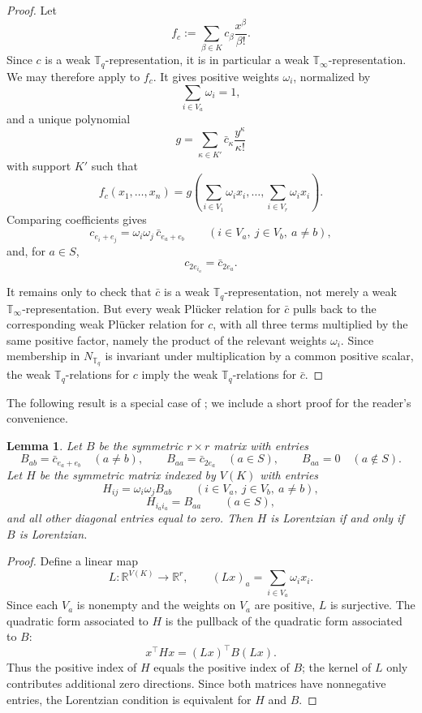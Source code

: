 \documentclass[12pt]{amsart}
\newtheorem{lemma}[theorem]{Lemma}
\theoremstyle{definition}
\newcommand{\1}{\mathbf{1}}
\newcommand\T{{\mathbb T}}
\newcommand{\mk}[2][]{\todo[color=orange, #1]{\textbf{Mario}: #2}}
\begin{document}
\begin{proof}
Let
\[
f_c:=\sum_{\beta\in K} c_\beta \frac{x^\beta}{\beta!}.
\]
Since $c$ is a weak $\T_q$-representation, it is in particular a weak
$\T_\infty$-representation.  We may therefore apply \cite[Theorem 4.7]{BHKL1} to $f_c$.  It gives positive
weights $\omega_i$, normalized by
\[
\sum_{i\in V_a}\omega_i=1,
\]
and a unique polynomial
\[
g=\sum_{\kappa\in K'}\bar c_\kappa \frac{y^\kappa}{\kappa!}
\]
with support $K'$ such that
\[
f_c(x_1,\ldots,x_n)
=
g\left(\sum_{i\in V_1}\omega_i x_i,\ldots,
        \sum_{i\in V_r}\omega_i x_i\right).
\]
Comparing coefficients gives
\[
c_{e_i+e_j}
=
\omega_i\omega_j\,\bar c_{e_a+e_b}
\qquad
(i\in V_a,\ j\in V_b,\ a\ne b),
\]
and, for $a\in S$,
\[
c_{2e_{i_a}}=\bar c_{2e_a}.
\]

It remains only to check that $\bar c$ is a weak $\T_q$-representation, not merely
a weak $\T_\infty$-representation.  But every weak Pl\"ucker relation for $\bar c$
pulls back to the corresponding weak Pl\"ucker relation for $c$, with all three
terms multiplied by the same positive factor, namely the product of the relevant
weights $\omega_i$.  Since membership in $N_{\T_q}$ is invariant under multiplication
by a common positive scalar, the weak $\T_q$-relations for $c$ imply the weak
$\T_q$-relations for $\bar c$.
\end{proof}

The following result is a special case of \cite[Theorem~4.7(2)]{BHKL1}; we include a short proof for the reader's convenience.


\begin{lemma}
\label{lem:block-lorentzian-equivalence}
Let $B$ be the symmetric $r\times r$ matrix with entries
\[
B_{ab}=\bar c_{e_a+e_b}\quad(a\ne b),
\qquad
B_{aa}=\bar c_{2e_a}\quad(a\in S),
\qquad
B_{aa}=0\quad(a\notin S).
\]
Let $H$ be the symmetric matrix indexed by $V(K)$ with entries
\[
H_{ij}=\omega_i\omega_j B_{ab}
\qquad (i\in V_a,\ j\in V_b,\ a\ne b),
\]
\[
H_{i_ai_a}=B_{aa}\qquad(a\in S),
\]
and all other diagonal entries equal to zero.  Then $H$ is Lorentzian if and only
if $B$ is Lorentzian.
\end{lemma}

\begin{proof}
Define a linear map
\[
L:\mathbb R^{V(K)}\longrightarrow \mathbb R^r,
\qquad
(Lx)_a=\sum_{i\in V_a}\omega_i x_i.
\]
Since each $V_a$ is nonempty and the weights on $V_a$ are positive, $L$ is
surjective.  The quadratic form associated to $H$ is the pullback of the
quadratic form associated to $B$:
\[
x^\top Hx=(Lx)^\top B(Lx).
\]
Thus the positive index of $H$ equals the positive index of $B$; the kernel of
$L$ only contributes additional zero directions.  Since both matrices have
nonnegative entries, the Lorentzian condition is equivalent for $H$ and $B$.
\end{proof}
\end{document}
